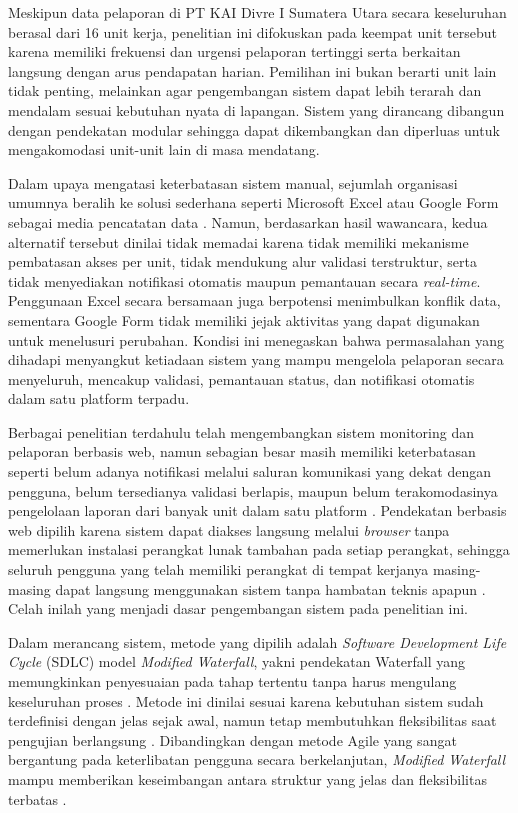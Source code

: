 Meskipun data pelaporan di PT KAI Divre I Sumatera Utara secara keseluruhan berasal dari 16 unit kerja, penelitian ini difokuskan pada keempat unit tersebut karena memiliki frekuensi dan urgensi pelaporan tertinggi serta berkaitan langsung dengan arus pendapatan harian. Pemilihan ini bukan berarti unit lain tidak penting, melainkan agar pengembangan sistem dapat lebih terarah dan mendalam sesuai kebutuhan nyata di lapangan. Sistem yang dirancang dibangun dengan pendekatan modular sehingga dapat dikembangkan dan diperluas untuk mengakomodasi unit-unit lain di masa mendatang. \par

Dalam upaya mengatasi keterbatasan sistem manual, sejumlah organisasi umumnya beralih ke solusi sederhana seperti Microsoft Excel atau Google Form sebagai media pencatatan data \cite{ningsih2023perbandingan}. Namun, berdasarkan hasil wawancara, kedua alternatif tersebut dinilai tidak memadai karena tidak memiliki mekanisme pembatasan akses per unit, tidak mendukung alur validasi terstruktur, serta tidak menyediakan notifikasi otomatis maupun pemantauan secara \textit{real-time}. Penggunaan Excel secara bersamaan juga berpotensi menimbulkan konflik data, sementara Google Form tidak memiliki jejak aktivitas yang dapat digunakan untuk menelusuri perubahan. Kondisi ini menegaskan bahwa permasalahan yang dihadapi menyangkut ketiadaan sistem yang mampu mengelola pelaporan secara menyeluruh, mencakup validasi, pemantauan status, dan notifikasi otomatis dalam satu platform terpadu. \par

Berbagai penelitian terdahulu telah mengembangkan sistem monitoring dan pelaporan berbasis web, namun sebagian besar masih memiliki keterbatasan seperti belum adanya notifikasi melalui saluran komunikasi yang dekat dengan pengguna, belum tersedianya validasi berlapis, maupun belum terakomodasinya pengelolaan laporan dari banyak unit dalam satu platform \cite{nugroho2025monitoring}\cite{mallisza2022waterfall}. Pendekatan berbasis web dipilih karena sistem dapat diakses langsung melalui \textit{browser} tanpa memerlukan instalasi perangkat lunak tambahan pada setiap perangkat, sehingga seluruh pengguna yang telah memiliki perangkat di tempat kerjanya masing-masing dapat langsung menggunakan sistem tanpa hambatan teknis apapun \cite{tarigan2024manajemen}. Celah inilah yang menjadi dasar pengembangan sistem pada penelitian ini. \par

Dalam merancang sistem, metode yang dipilih adalah \textit{Software Development Life Cycle} (SDLC) model \textit{Modified Waterfall}, yakni pendekatan Waterfall yang memungkinkan penyesuaian pada tahap tertentu tanpa harus mengulang keseluruhan proses \cite{prasnowo2024waterfall}. Metode ini dinilai sesuai karena kebutuhan sistem sudah terdefinisi dengan jelas sejak awal, namun tetap membutuhkan fleksibilitas saat pengujian berlangsung \cite{prasnowo2024waterfall}. Dibandingkan dengan metode Agile yang sangat bergantung pada keterlibatan pengguna secara berkelanjutan, \textit{Modified Waterfall} mampu memberikan keseimbangan antara struktur yang jelas dan fleksibilitas terbatas \cite{ningsih2023perbandingan}. \par

